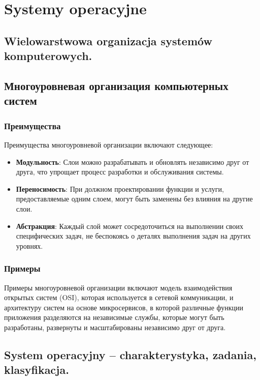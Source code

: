 \chapter{Systemy operacyjne}
\section{Wielowarstwowa organizacja systemów komputerowych.}

\section{Многоуровневая организация компьютерных систем}

\subsection{Преимущества}

Преимущества многоуровневой организации включают следующее:

\begin{itemize}
\item \textbf{Модульность}: Слои можно разрабатывать и обновлять независимо друг от друга, что упрощает процесс разработки и обслуживания системы.
\item \textbf{Переносимость}: При должном проектировании функции и услуги, предоставляемые одним слоем, могут быть заменены без влияния на другие слои.
\item \textbf{Абстракция}: Каждый слой может сосредоточиться на выполнении своих специфических задач, не беспокоясь о деталях выполнения задач на других уровнях.
\end{itemize}

\subsection{Примеры}

Примеры многоуровневой организации включают модель взаимодействия открытых систем (OSI), которая используется в сетевой коммуникации, и архитектуру систем на основе микросервисов, в которой различные функции приложения разделяются на независимые службы, которые могут быть разработаны, развернуты и масштабированы независимо друг от друга.

\section{System operacyjny – charakterystyka, zadania, klasyfikacja. }

